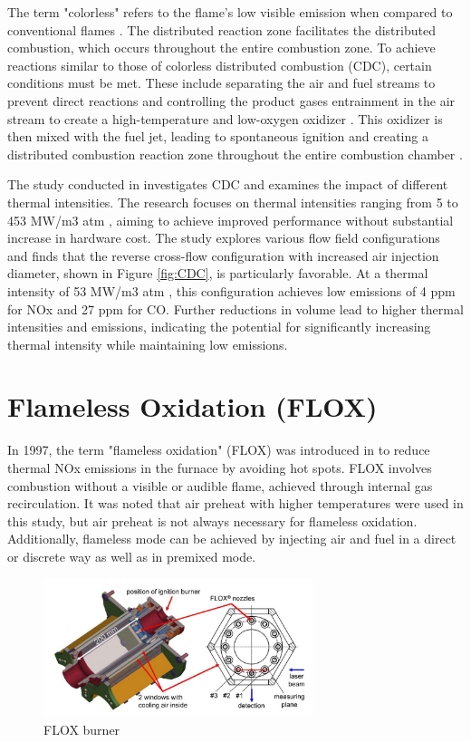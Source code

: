 The term "colorless" refers to the flame's low visible emission when compared to conventional flames \cite{ARGHODE201129}. The distributed reaction zone facilitates the distributed combustion, which occurs throughout the entire combustion zone. To achieve reactions similar to those of colorless distributed combustion (CDC), certain conditions must be met. These include separating the air and fuel streams to prevent direct reactions and controlling the product gases entrainment in the air stream to create a high-temperature and low-oxygen oxidizer \cite{ARGHODE201129}. This oxidizer is then mixed with the fuel jet, leading to spontaneous ignition and creating a distributed combustion reaction zone throughout the entire combustion chamber \cite{ARGHODE201129}.

The study conducted in \cite{ARGHODE2013930} investigates CDC and examines the impact of different thermal intensities. The research focuses on thermal intensities ranging from 5 to 453 MW/m3 atm \cite{doi:10.1021/ef402357t}, aiming to achieve improved performance without substantial increase in hardware cost. The study explores various flow field configurations and finds that the reverse cross-flow configuration with increased air injection diameter, shown in Figure \ref{fig:CDC}, is particularly favorable. At a thermal intensity of 53 MW/m3 atm \cite{doi:10.1021/ef402357t}, this configuration achieves low emissions of 4 ppm for NOx and 27 ppm for CO. Further reductions in volume lead to higher thermal intensities and emissions, indicating the potential for significantly increasing thermal intensity while maintaining low emissions.
 
\section{Flameless Oxidation (FLOX)}
In 1997, the term "flameless oxidation" (FLOX) was introduced in \cite{WUNNING199781} to reduce thermal NOx emissions in the furnace by avoiding hot spots. FLOX involves combustion without a visible or audible flame, achieved through internal gas recirculation. It was noted that air preheat with higher temperatures were used in this study, but air preheat is not always necessary for flameless oxidation. Additionally, flameless mode can be achieved by injecting air and fuel in a direct or discrete way as well as in premixed mode.

\begin{figure}[!h]
    \centering    
    \includegraphics[width=0.7\textwidth]{Chapter2/Images/FLOX.jpeg}
    \caption[FLOX burner]{FLOX burner \cite{LAMMEL4001825}}
    \label{fig:FLOX}
\end{figure}

